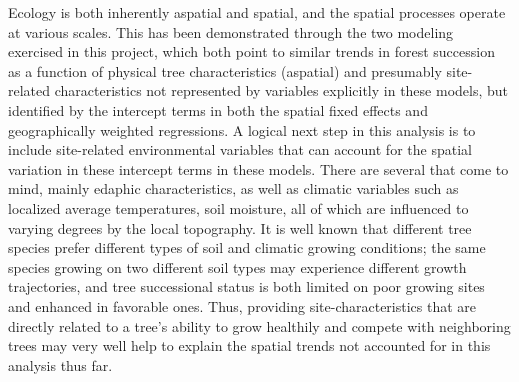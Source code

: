 \documentclass[12pt,a4paper]{article}
\begin{document}
Ecology is both inherently aspatial and spatial, and the spatial processes operate at various scales.  This has been demonstrated through the two modeling exercised in this project, which both point to similar trends in forest succession as a function of physical tree characteristics (aspatial) and presumably site-related characteristics not represented by variables explicitly in these models, but identified by the intercept terms in both the spatial fixed effects and geographically weighted regressions.  A logical next step in this analysis is to include site-related environmental variables that can account for the spatial variation in these intercept terms in these models.  There are several that come to mind, mainly edaphic characteristics, as well as climatic variables such as localized average temperatures, soil moisture, all of which are influenced to varying degrees by the local topography.  It is well known that different tree species prefer different types of soil and climatic growing conditions; the same species growing on two different soil types may experience different growth trajectories, and tree successional status is both limited on poor growing sites and enhanced in favorable ones.  Thus, providing site-characteristics that are directly related to a tree's ability to grow healthily and compete with neighboring trees may very well help to explain the spatial trends not accounted for in this analysis thus far.
\end{document}

